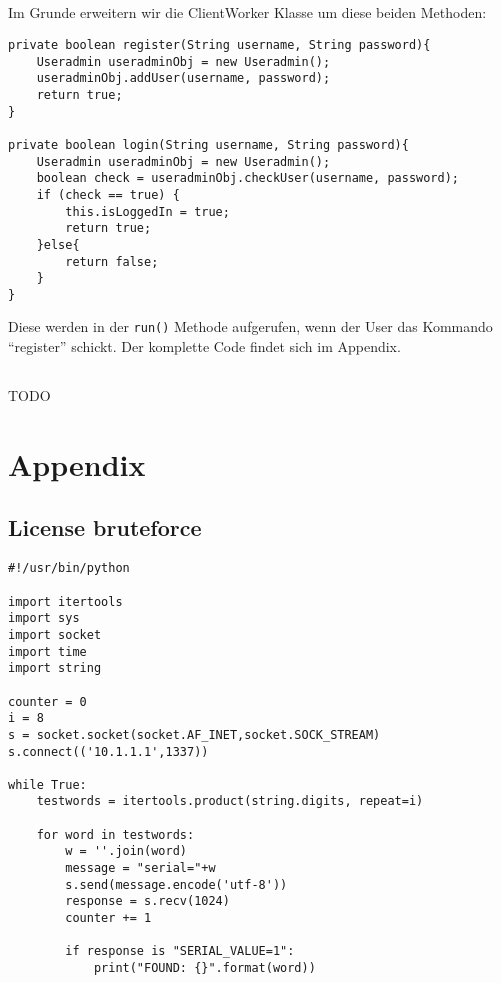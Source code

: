 \documentclass[10pt,a4paper]{article}
\begin{document}
\subsection{}
Im Grunde erweitern wir die ClientWorker Klasse um diese beiden Methoden:
\begin{verbatim}
private boolean register(String username, String password){
    Useradmin useradminObj = new Useradmin();
    useradminObj.addUser(username, password);
    return true;
}

private boolean login(String username, String password){
    Useradmin useradminObj = new Useradmin();
    boolean check = useradminObj.checkUser(username, password);
    if (check == true) {
        this.isLoggedIn = true;
        return true;
    }else{
        return false;
    }
}
\end{verbatim}
Diese werden in der \texttt{run()} Methode aufgerufen,
wenn der User das Kommando ``register'' schickt. Der komplette
Code findet sich im Appendix.

\subsection{}
TODO


\newpage
\section{Appendix}

\subsection{License bruteforce}
\begin{verbatim}
#!/usr/bin/python

import itertools
import sys
import socket
import time
import string

counter = 0
i = 8
s = socket.socket(socket.AF_INET,socket.SOCK_STREAM)
s.connect(('10.1.1.1',1337))

while True:
    testwords = itertools.product(string.digits, repeat=i)

    for word in testwords:
        w = ''.join(word)
        message = "serial="+w
        s.send(message.encode('utf-8'))
        response = s.recv(1024)
        counter += 1

        if response is "SERIAL_VALUE=1":
            print("FOUND: {}".format(word))
\end{verbatim}

\newpage
\end{document}
